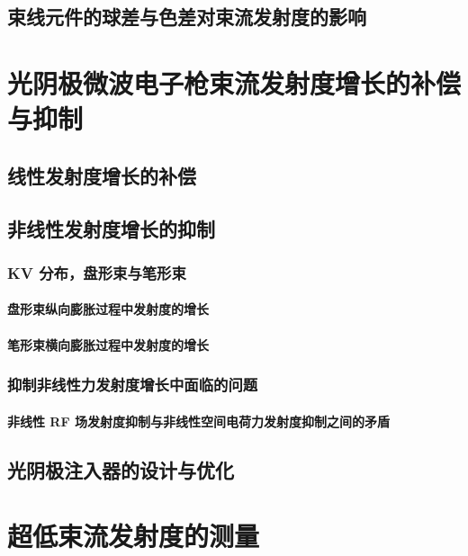 \subsection{束线元件的球差与色差对束流发射度的影响}

\section{光阴极微波电子枪束流发射度增长的补偿与抑制}

\subsection{线性发射度增长的补偿}

\subsection{非线性发射度增长的抑制}

\subsubsection{KV 分布，盘形束与笔形束}

\paragraph{盘形束纵向膨胀过程中发射度的增长}

\paragraph{笔形束横向膨胀过程中发射度的增长}

\subsubsection{抑制非线性力发射度增长中面临的问题}

\paragraph{非线性 RF 场发射度抑制与非线性空间电荷力发射度抑制之间的矛盾}

\subsection{光阴极注入器的设计与优化}

\section{超低束流发射度的测量}
